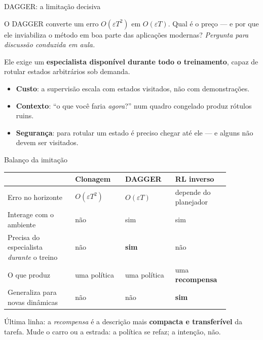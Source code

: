 \documentclass[aspectratio=169, 11pt]{beamer}
\newcommand{\paradiscussao}{\smallskip
  {\footnotesize\color{rlCinza}\itshape Pergunta para discussão conduzida em aula.}}
\begin{document}
\begin{frame}{DAGGER: a limitação decisiva}

  \begin{quizbox}{}
    O DAGGER converte um erro $O(\varepsilon T^2)$ em $O(\varepsilon T)$. Qual é
    o preço --- e por que ele inviabiliza o método em boa parte das aplicações
    modernas?
    \paradiscussao
  \end{quizbox}

  \pause

  \begin{respbox}
    Ele exige um \textbf{especialista disponível durante todo o treinamento},
    capaz de rotular estados arbitrários sob demanda.
    \begin{itemize}\setlength{\itemsep}{0.1ex}
      \item \textbf{Custo}: a supervisão escala com estados visitados, não com
        demonstrações.
      \item \textbf{Contexto}: ``o que você faria \emph{agora}?'' num quadro
        congelado produz rótulos ruins.
      \item \textbf{Segurança}: para rotular um estado é preciso chegar até ele
        --- e alguns não devem ser visitados.
    \end{itemize}
  \end{respbox}
\end{frame}

\begin{frame}{Balanço da imitação}

  \begin{center}\footnotesize
  \begin{tabular}{@{}p{0.27\linewidth}p{0.2\linewidth}p{0.2\linewidth}p{0.2\linewidth}@{}}
    \toprule
    & \textbf{Clonagem} & \textbf{DAGGER} & \textbf{RL inverso} \\
    \midrule
    Erro no horizonte & $O(\varepsilon T^2)$ & $O(\varepsilon T)$ &
      depende do planejador \\
    Interage com o ambiente & não & sim & sim \\
    Precisa do especialista \emph{durante} o treino & não & \textbf{sim} & não \\
    O que produz & uma política & uma política & uma \textbf{recompensa} \\
    Generaliza para novas dinâmicas & não & não & \textbf{sim} \\
    \bottomrule
  \end{tabular}
  \end{center}

  \begin{ideiabox}
    Última linha: a \emph{recompensa} é a descrição mais \textbf{compacta e
    transferível} da tarefa. Mude o carro ou a estrada: a política se refaz;
    a intenção, não.
  \end{ideiabox}
\end{frame}
\end{document}
